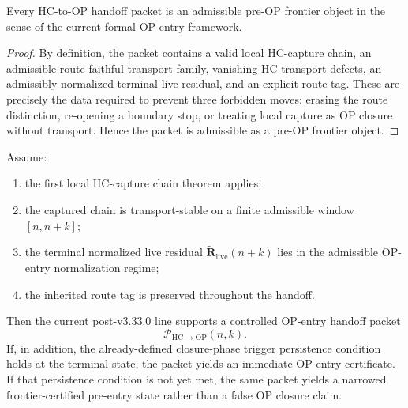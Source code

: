 \begin{proposition}
\label{prop:handoff-packets-are-admissible-pre-op-frontier-objects}
Every HC-to-OP handoff packet is an admissible pre-OP frontier object in the sense of the current formal OP-entry framework.
\end{proposition}

\begin{proof}
By definition, the packet contains a valid local HC-capture chain, an admissible route-faithful transport family, vanishing HC transport defects, an admissibly normalized terminal live residual, and an explicit route tag.  These are precisely the data required to prevent three forbidden moves: erasing the route distinction, re-opening a boundary stop, or treating local capture as OP closure without transport.  Hence the packet is admissible as a pre-OP frontier object.
\end{proof}

\begin{theorem}
\label{thm:first-transport-stable-hc-capture-to-op-entry-criterion}
Assume:
\begin{enumerate}[leftmargin=2em,label=(\alph*)]
  \item the first local HC-capture chain theorem applies;
  \item the captured chain is transport-stable on a finite admissible window $[n,n+k]$;
  \item the terminal normalized live residual $\widetilde{\mathbf R}_{\mathrm{live}}(n+k)$ lies in the admissible OP-entry normalization regime;
  \item the inherited route tag is preserved throughout the handoff.
\end{enumerate}
Then the current post-v3.33.0 line supports a controlled OP-entry handoff packet
\[
  \mathcal P_{\mathrm{HC}\to\mathrm{OP}}(n,k).
\]
If, in addition, the already-defined closure-phase trigger persistence condition holds at the terminal state, the packet yields an immediate OP-entry certificate.  If that persistence condition is not yet met, the same packet yields a narrowed frontier-certified pre-entry state rather than a false OP closure claim.
\end{theorem}

